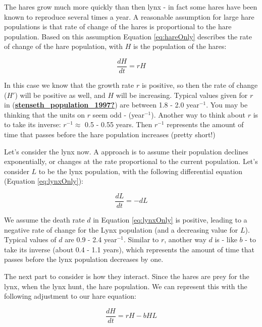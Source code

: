 \documentclass[
]{book}
\theoremstyle{definition}
\theoremstyle{definition}
\theoremstyle{definition}
\theoremstyle{remark}
\begin{document}
The hares grow much more quickly than then lynx - in fact some hares have been known to reproduce several times a year. A reasonable assumption for large hare populations is that rate of change of the hares is proportional to the hare population. Based on this assumption Equation \eqref{eq:hareOnly} describes the rate of change of the hare population, with \(H\) is the population of the hares:

\begin{equation}
\frac{dH}{dt} = r H \label{eq:hareOnly}
\end{equation}

In this case we know that the growth rate \(r\) is positive, so then the rate of change (\(H'\)) will be positive as well, and \(H\) will be increasing. Typical values given for \(r\) in (\protect\hyperlink{ref-stenseth_population_1997}{\textbf{stenseth\_population\_1997?}}) are between 1.8 - 2.0 year\(^{-1}\). You may be thinking that the units on \(r\) seem odd - (year\(^{-1}\)). Another way to think about \(r\) is to take its inverse: \(r^{-1} \approx\) 0.5 - 0.55 years. Then \(r^{-1}\) represents the amount of time that passes before the hare population increases (pretty short!)

Let's consider the lynx now. A approach is to assume their population declines exponentially, or changes at the rate proportional to the current population. Let's consider \(L\) to be the lynx population, with the following differential equation (Equation \eqref{eq:lynxOnly}):

\begin{equation}
\frac{dL}{dt} = -dL \label{eq:lynxOnly}
\end{equation}

We assume the death rate \(d\) in Equation \eqref{eq:lynxOnly} is positive, leading to a negative rate of change for the Lynx population (and a decreasing value for \(L\)). Typical values of \(d\) are 0.9 - 2.4 year\(^{-1}\). Similar to \(r\), another way \(d\) is - like \(b\) - to take its inverse (about 0.4 - 1.1 years), which represents the amount of time that passes before the lynx population decreases by one.

The next part to consider is how they interact. Since the hares are prey for the lynx, when the lynx hunt, the hare population. We can represent this with the following adjustment to our hare equation:

\begin{equation}
\frac{dH}{dt} = r H - b HL
\end{equation}
\end{document}
